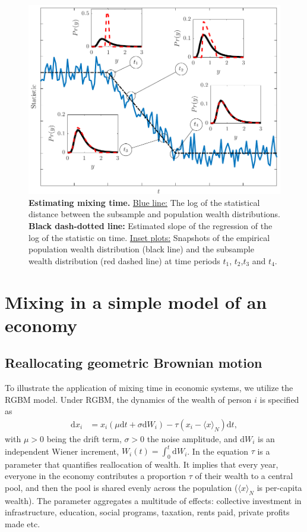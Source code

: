 \documentclass[11pt]{article}
\numberwithin{equation}{section}
\begin{document}
\begin{figure}[t!]
\includegraphics[width=\linewidth]{figs/fig_mixing_time.pdf}
\caption{\textbf{Estimating mixing time.} \underline{Blue line:} The log of the statistical distance between the subsample and population wealth distributions. \textbf{Black dash-dotted line:} Estimated slope of the regression of the log of the statistic on time. \underline{Inset plots:} Snapshots of the empirical population wealth distribution (black line) and the subsample wealth distribution (red dashed line) at time periods $t_1$, $t_2$,$t_3$ and $t_4$. \label{fig:mixing-time}}
\end{figure}


\section{Mixing in a simple model of an economy}\label{sec:rgbm}

\subsection{Reallocating geometric Brownian motion}
To illustrate the application of mixing time in economic systems, we utilize the RGBM model. Under RGBM, the dynamics of the wealth of person $i$ is specified as
\begin{align}
    \mathrm{d} x_i &= x_i \left( \mu \mathrm{d}t + \sigma \mathrm{d}W_i \right) - \tau \left( x_i - \langle x \rangle_N \right) \mathrm{d}t,
\label{eq:rgbm}
\end{align}
with $\mu > 0$ being the drift term, $\sigma > 0$ the noise amplitude, and $\mathrm{d}W_i$ is an independent Wiener increment, $W_i(t) =\int_0^t \mathrm{d}W_i$. In the equation $\tau$ is a parameter that quantifies reallocation of wealth. It implies that every year, everyone in the economy contributes a proportion $\tau$ of their wealth to a central pool, and then the pool is shared evenly across the population ($\langle x \rangle_N$ is per-capita wealth). The parameter aggregates a multitude of effects: collective investment in infrastructure, education, social programs, taxation, rents paid, private profits made etc. 
\end{document}
